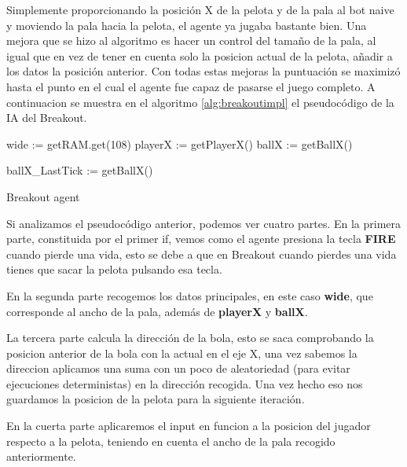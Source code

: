 Simplemente proporcionando la posición X de la pelota y de la pala al bot naive y moviendo la pala hacia la pelota, el agente ya jugaba bastante bien. Una mejora que se hizo al algoritmo es hacer un control del tamaño de la pala, al igual que en vez de tener en cuenta solo la posicion actual de la pelota, añadir a los datos la posición anterior. Con todas estas mejoras la puntuación se maximizó hasta el punto en el cual el agente fue capaz de pasarse el juego completo. A continuacion se muestra en el algoritmo \ref{alg:breakoutimpl}
el pseudocódigo de la IA del Breakout.

\vspace{4mm}
\begin{algorithm}[H]
	
	wide := getRAM.get(108)\;
	playerX := getPlayerX()\;
	ballX := getBallX()\;
	

	ballX\_LastTick := getBallX()\;
	
	\caption{Breakout agent}
	\label{alg:breakoutimpl}
\end{algorithm}

Si analizamos el pseudocódigo anterior, podemos ver cuatro partes. En la primera parte, constituida por el primer if, vemos como el agente presiona la tecla \textbf{FIRE} cuando pierde una vida, esto se debe a que en Breakout cuando pierdes una vida tienes que sacar la pelota pulsando esa tecla. 

En la segunda parte recogemos los datos principales, en este caso \textbf{wide}, que corresponde al ancho de la pala, además de \textbf{playerX} y \textbf{ballX}. 

La tercera parte calcula la dirección de la bola, esto se saca comprobando la posicion anterior de la bola con la actual en el eje X, una vez sabemos la direccion aplicamos una suma con un poco de aleatoriedad (para evitar ejecuciones deterministas) en la dirección recogida. Una vez hecho eso nos guardamos la posicion de la pelota para la siguiente iteración.

En la cuerta parte aplicaremos el input en funcion a la posicion del jugador respecto a la pelota, teniendo en cuenta el ancho de la pala recogido anteriormente.

